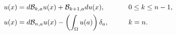 \documentclass[10pt,a4paper]{article}
\begin{document}
\begin{alignat*}{4}
    u(x) &= d {\mathcal B}_{k,a} u(x) + {\mathcal B}_{k+1,a} d u(x),          \qquad && 0 \leq k \leq n-1,
    \\
    u(x) &= d {\mathcal B}_{n,a} u(x) - \left( \int_{\Omega} u(a) \right) \delta_a, \qquad && k = n.
\end{alignat*}
\end{document}

